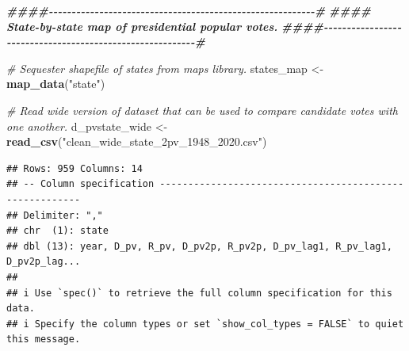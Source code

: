 \documentclass[
]{article}
\newenvironment{Shaded}{\begin{snugshade}}{\end{snugshade}}
\newcommand{\AttributeTok}[1]{\textcolor[rgb]{0.13,0.29,0.53}{#1}}
\newcommand{\CommentTok}[1]{\textcolor[rgb]{0.56,0.35,0.01}{\textit{#1}}}
\newcommand{\DecValTok}[1]{\textcolor[rgb]{0.00,0.00,0.81}{#1}}
\newcommand{\DocumentationTok}[1]{\textcolor[rgb]{0.56,0.35,0.01}{\textbf{\textit{#1}}}}
\newcommand{\FunctionTok}[1]{\textcolor[rgb]{0.13,0.29,0.53}{\textbf{#1}}}
\newcommand{\NormalTok}[1]{#1}
\newcommand{\OtherTok}[1]{\textcolor[rgb]{0.56,0.35,0.01}{#1}}
\newcommand{\SpecialCharTok}[1]{\textcolor[rgb]{0.81,0.36,0.00}{\textbf{#1}}}
\newcommand{\StringTok}[1]{\textcolor[rgb]{0.31,0.60,0.02}{#1}}
\begin{document}
\begin{Shaded}
\begin{Highlighting}[]
\DocumentationTok{\#\#\#\#{-}{-}{-}{-}{-}{-}{-}{-}{-}{-}{-}{-}{-}{-}{-}{-}{-}{-}{-}{-}{-}{-}{-}{-}{-}{-}{-}{-}{-}{-}{-}{-}{-}{-}{-}{-}{-}{-}{-}{-}{-}{-}{-}{-}{-}{-}{-}{-}{-}{-}{-}{-}{-}{-}{-}{-}{-}{-}\#}
\DocumentationTok{\#\#\#\# State{-}by{-}state map of presidential popular votes.}
\DocumentationTok{\#\#\#\#{-}{-}{-}{-}{-}{-}{-}{-}{-}{-}{-}{-}{-}{-}{-}{-}{-}{-}{-}{-}{-}{-}{-}{-}{-}{-}{-}{-}{-}{-}{-}{-}{-}{-}{-}{-}{-}{-}{-}{-}{-}{-}{-}{-}{-}{-}{-}{-}{-}{-}{-}{-}{-}{-}{-}{-}{-}{-}\#}

\CommentTok{\# Sequester shapefile of states from \textasciigrave{}maps\textasciigrave{} library.}
\NormalTok{states\_map }\OtherTok{\textless{}{-}} \FunctionTok{map\_data}\NormalTok{(}\StringTok{"state"}\NormalTok{)}

\CommentTok{\# Read wide version of dataset that can be used to compare candidate votes with one another. }
\NormalTok{d\_pvstate\_wide }\OtherTok{\textless{}{-}} \FunctionTok{read\_csv}\NormalTok{(}\StringTok{"clean\_wide\_state\_2pv\_1948\_2020.csv"}\NormalTok{)}
\end{Highlighting}
\end{Shaded}

\begin{verbatim}
## Rows: 959 Columns: 14
## -- Column specification --------------------------------------------------------
## Delimiter: ","
## chr  (1): state
## dbl (13): year, D_pv, R_pv, D_pv2p, R_pv2p, D_pv_lag1, R_pv_lag1, D_pv2p_lag...
## 
## i Use `spec()` to retrieve the full column specification for this data.
## i Specify the column types or set `show_col_types = FALSE` to quiet this message.
\end{verbatim}

\begin{Shaded}
\end{Shaded}
\end{document}
